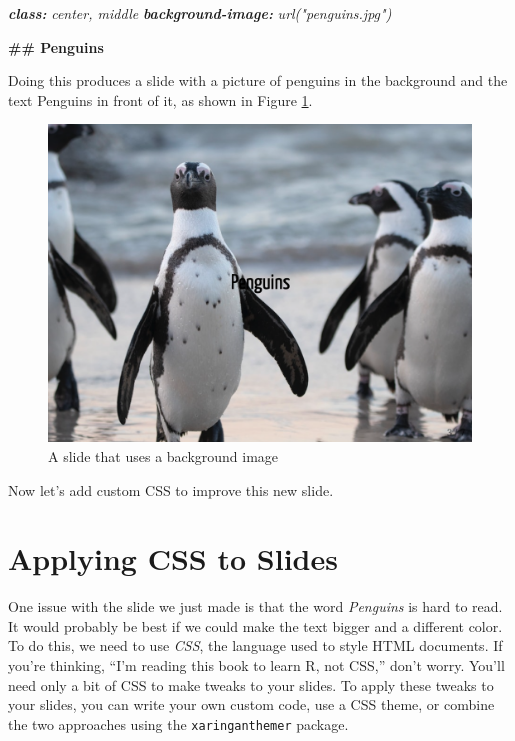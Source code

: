 \documentclass[
]{book}
\newenvironment{Shaded}{\begin{snugshade}}{\end{snugshade}}
\newcommand{\AnnotationTok}[1]{\textcolor[rgb]{0.56,0.35,0.01}{\textbf{\textit{#1}}}}
\newcommand{\CommentTok}[1]{\textcolor[rgb]{0.56,0.35,0.01}{\textit{#1}}}
\newcommand{\FunctionTok}[1]{\textcolor[rgb]{0.13,0.29,0.53}{\textbf{#1}}}
\begin{document}
\begin{Shaded}
\begin{Highlighting}[]
\AnnotationTok{class:}\CommentTok{ center, middle}
\AnnotationTok{background{-}image:}\CommentTok{ url("penguins.jpg")}

\FunctionTok{\#\# Penguins}
\end{Highlighting}
\end{Shaded}

Doing this produces a slide with a picture of penguins in the background and the text Penguins in front of it, as shown in Figure \ref{fig:xaringan-background-image}.

\begin{figure}
\includegraphics[width=1\linewidth]{assets/xaringan-background-image} \caption{A slide that uses a background image}\label{fig:xaringan-background-image}
\end{figure}

Now let's add custom CSS to improve this new slide.

\hypertarget{applying-css-to-slides}{%
\section*{Applying CSS to Slides}\label{applying-css-to-slides}}

One issue with the slide we just made is that the word \emph{Penguins} is hard to read. It would probably be best if we could make the text bigger and a different color. To do this, we need to use \emph{CSS}, the language used to style HTML documents. If you're thinking, ``I'm reading this book to learn R, not CSS,'' don't worry. You'll need only a bit of CSS to make tweaks to your slides. To apply these tweaks to your slides, you can write your own custom code, use a CSS theme, or combine the two approaches using the \texttt{xaringanthemer} package.
\end{document}
